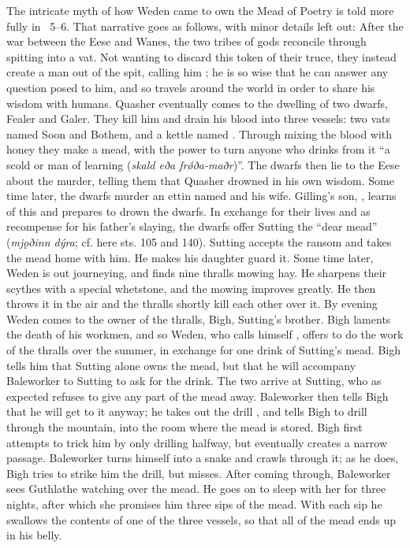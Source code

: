 The intricate myth of how Weden came to own the Mead of Poetry is told more fully in \Skaldskaparmal\ 5–6. That narrative goes as follows, with minor details left out:
After the war between the Eese and Wanes, the two tribes of gods reconcile through spitting into a vat. Not wanting to discard this token of their truce, they instead create a man out of the spit, calling him ; he is so wise that he can answer any question posed to him, and so travels around the world in order to share his wisdom with humans.
Quasher eventually comes to the dwelling of two dwarfs, Fealer and Galer. They kill him and drain his blood into three vessels: two vats named Soon and Bothem, and a kettle named . Through mixing the blood with honey they make a mead, with the power to turn anyone who drinks from it “a scold or man of learning (\emph{skald eða frǿða-maðr})”. The dwarfs then lie to the Eese about the murder, telling them that Quasher drowned in his own wisdom.
Some time later, the dwarfs murder an ettin named  and his wife. Gilling’s son, , learns of this and prepares to drown the dwarfs. In exchange for their lives and as recompense for his father’s slaying, the dwarfs offer Sutting the “dear mead” (\emph{mjǫðinn dýra}; cf. here sts. 105 and 140). Sutting accepts the ransom and takes the mead home with him. He makes his daughter  guard it.
Some time later, Weden is out journeying, and finds nine thralls mowing hay. He sharpens their scythes with a special whetstone, and the mowing improves greatly. He then throws it in the air and the thralls shortly kill each other over it. By evening Weden comes to the owner of the thralls, Bigh, Sutting’s brother. Bigh laments the death of his workmen, and so Weden, who calls himself , offers to do the work of the thralls over the summer, in exchange for one drink of Sutting’s mead. Bigh tells him that Sutting alone owns the mead, but that he will accompany Baleworker to Sutting to ask for the drink.
The two arrive at Sutting, who as expected refuses to give any part of the mead away. Baleworker then tells Bigh that he will get to it anyway; he takes out the drill , and tells Bigh to drill through the mountain, into the room where the mead is stored. Bigh first attempts to trick him by only drilling halfway, but eventually creates a narrow passage. Baleworker turns himself into a snake and crawls through it; as he does, Bigh tries to strike him the drill, but misses.
After coming through, Baleworker sees Guthlathe watching over the mead. He goes on to sleep with her for three nights, after which she promises him three sips of the mead. With each sip he swallows the contents of one of the three vessels, so that all of the mead ends up in his belly.

